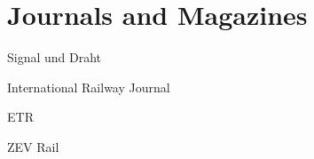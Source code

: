 ﻿\section{Journals and Magazines}

\begin{activity}{Signal und Draht}
\end{activity}

\begin{activity}{International Railway Journal}
\end{activity}


\begin{activity}{ETR}
\end{activity}

\begin{activity}{ZEV Rail}
\end{activity}

